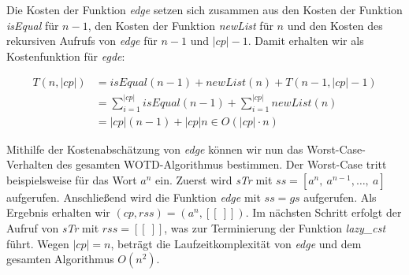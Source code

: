\documentclass[12pt]{report}
\newcommand{\abs}[1]{\left|#1\right|}
\begin{document}

Die Kosten der Funktion \textit{edge} setzen sich zusammen aus den Kosten der Funktion \textit{isEqual} für $n - 1$, den Kosten der Funktion \textit{newList} für $n$ und den Kosten des rekursiven Aufrufs von \textit{edge} für $n - 1$ und $\abs{cp} - 1$. Damit erhalten wir als Kostenfunktion für \textit{egde}:

\begin{align*}
    T(n,\abs{cp}) &= isEqual(n - 1) + newList(n) + T(n-1,\abs{cp}-1) \\
                  &= \sum_{i = 1}^{\abs{cp}}{isEqual(n-1)} + \sum_{i = 1}^{\abs{cp}}{newList(n)}\\
                  &= \abs{cp} (n - 1) + \abs{cp} n \in O(\abs{cp} \cdot n)
\end{align*}

Mithilfe der Kostenabschätzung von \textit{edge} können wir nun das Worst-Case-Verhalten des gesamten WOTD-Algorithmus bestimmen. Der Worst-Case tritt beispielsweise für das Wort $a^n$ ein.  Zuerst wird \textit{sTr} mit $ss = [a^n,\:a^{n-1}, \dots ,\:a]$ aufgerufen. Anschließend wird die Funktion \textit{edge} mit $ss = gs$ aufgerufen. Als Ergebnis erhalten wir $(cp,rss) = (a^n, [[\:]])$. Im nächsten Schritt erfolgt der Aufruf von \textit{sTr} mit $rss = [[\:]]$, was zur Terminierung der Funktion \textit{lazy\_cst} führt. Wegen $\abs{cp} = n$, beträgt die Laufzeitkomplexität von \textit{edge} und dem gesamten Algorithmus $O(n^2)$.

\end{document}
